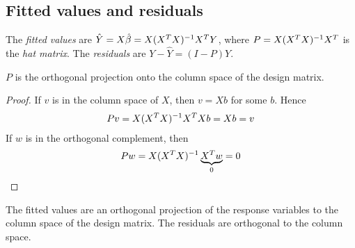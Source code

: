 \subsection{Fitted values and residuals}
\begin{definition}
	The \textit{fitted values} are $\hat Y = X \hat \beta = X(X^T X)^{-1} X^T Y$, where $P = X (X^T X)^{-1} X^T$ is the \textit{hat matrix}.
	The \textit{residuals} are $Y - \hat Y = (I-P)Y$.
\end{definition}
\begin{proposition}
	$P$ is the orthogonal projection onto the column space of the design matrix.
\end{proposition}
\begin{proof}
	If $v$ is in the column space of $X$, then $v = Xb$ for some $b$.
	Hence
	\begin{align*}
		Pv = X(X^T X)^{-1} X^T X b = Xb = v
	\end{align*}
	If $w$ is in the orthogonal complement, then
	\begin{align*}
		Pw = X(X^T X)^{-1} \underbrace{X^T w}_{0} = 0
	\end{align*}
\end{proof}
\begin{corollary}
	The fitted values are an orthogonal projection of the response variables to the column space of the design matrix.
	The residuals are orthogonal to the column space.
\end{corollary}

